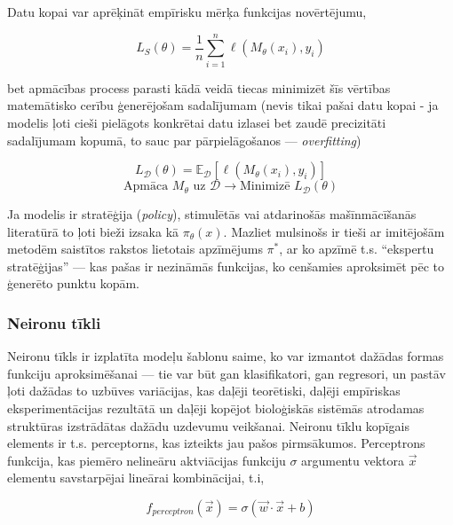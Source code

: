 \documentclass[12pt, a4paper]{article}
\numberwithin{equation}{section} %
\begin{document}
Datu kopai var aprēķināt empīrisku mērķa funkcijas novērtējumu,

\begin{equation} 
    L_S(\theta) = \frac{1}{n}\sum_{i=1}^n\ell(M_{\theta}(x_i), y_i)
\end{equation}

bet apmācības process parasti kādā veidā tiecas minimizēt šīs vērtības matemātisko cerību ģenerējošam sadalījumam (nevis tikai pašai datu kopai - ja modelis ļoti cieši pielāgots konkrētai datu izlasei bet zaudē precizitāti sadalījumam kopumā, to sauc par pārpielāgošanos --- \textit{overfitting})

\begin{equation} 
    L_{\mathcal{D}}(\theta) = \mathbb{E}_{\mathcal{D}} [\ell(M_{\theta}(x_i), y_i)]
\end{equation}
\begin{equation} 
    \text{Apmāca } M_{\theta} \text{ uz } \mathcal{D} \rightarrow \text{Minimizē } L_{\mathcal{D}}(\theta)
\end{equation}

Ja modelis ir stratēģija (\textit{policy}), stimulētās vai atdarinošās mašīnmācīšanās literatūrā to ļoti bieži izsaka kā $\pi_{\theta}(x)$. Mazliet mulsinošs ir tieši ar imitējošām metodēm saistītos rakstos lietotais apzīmējums $\pi^*$, ar ko apzīmē t.s. ``ekspertu stratēģijas'' --- kas pašas ir nezināmās funkcijas, ko cenšamies aproksimēt pēc to ģenerēto punktu kopām. 


\subsubsection{Neironu tīkli}

Neironu tīkls ir izplatīta modeļu šablonu saime, ko var izmantot dažādas formas funkciju aproksimēšanai --- tie var būt gan klasifikatori, gan regresori, un pastāv ļoti dažādas to uzbūves variācijas, kas daļēji teorētiski, daļēji empīriskas eksperimentācijas rezultātā un daļēji kopējot bioloģiskās sistēmās atrodamas struktūras izstrādātas dažādu uzdevumu veikšanai. Neironu tīklu kopīgais elements ir t.s. perceptorns, kas izteikts jau pašos pirmsākumos\cite{mcculloch1943logical}. Perceptrons funkcija, kas piemēro nelineāru aktviācijas funkciju $\sigma$ argumentu vektora $\vec{x}$ elementu savstarpējai lineārai kombinācijai, t.i,


\begin{equation} 
    f_{perceptron}(\vec{x}) = \sigma(\vec{w} \cdot \vec{x}+b)
\end{equation}
\end{document}
